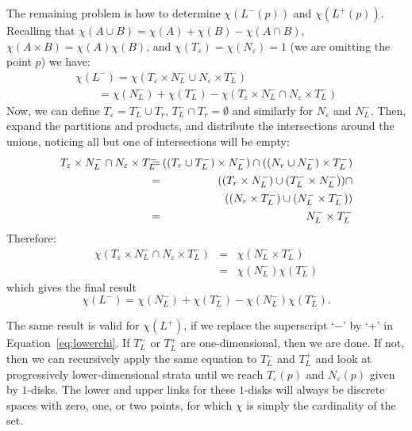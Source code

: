 The remaining problem is how to determine $\chi(L^-(p))$ and
$\chi(L^+(p))$. 
Recalling that $\chi(A \cup B) = \chi(A) + \chi(B) - \chi(A \cap B)$,
$\chi(A\times B)=\chi(A)\chi(B)$, and $\chi(T_\varepsilon)=\chi(N_\varepsilon)=1$ (we are omitting 
the point $p$) we have:
\begin{equation}
\begin{array}{l}
\chi(L^-) = \chi(T_\varepsilon \times N_L^- \cup N_\varepsilon \times T_L^-) \\
    \qquad  = \chi(N_L^-) + \chi(T_L^-) - \chi(T_\varepsilon \times N_L^- \cap N_\varepsilon \times T_L^-)
\end{array}
\end{equation}
Now, we can define $T_\varepsilon = T_L^- \cup T_r,\, T_L^- \cap T_r =
\emptyset$ and similarly for $N_\varepsilon$ and $N_L^-$.  Then,
expand the partitions and products, and distribute the intersections
around the unions, noticing all but one of intersections will be
empty:
\begin{eqnarray*}
T_\varepsilon \times N_L^- \cap N_\varepsilon \times T_L^- \hspace{-8.0px} &=& \hspace{-8.0px} ((T_r \cup T_L^-) \times N_L^-) \cap ((N_r \cup N_L^-) \times T_L^-) \\
\hspace{-8.0px} &=& \hspace{-8.0px} ((T_r \times N_L^-) \cup (T_L^- \times N_L^-)) \cap \\
\hspace{-8.0px} && \hspace{-8.0px}((N_r \times T_L^-) \cup (N_L^- \times T_L^-)) \\
\hspace{-8.0px} &=& \hspace{-8.0px}N_L^- \times T_L^-
\end{eqnarray*}
Therefore:
\begin{eqnarray*}
\chi(T_\varepsilon \times N_L^- \cap N_\varepsilon \times T_L^-) &=& \chi(N_L^- \times T_L^-) \\
&=& \chi(N_L^-)\chi(T_L^-)
\end{eqnarray*}
which gives the final result
\begin{equation}
\chi(L^-) = \chi(N_L^-)+\chi(T_L^-)-\chi(N_L^-)\chi(T_L^-) \label{eq:lowerchi}.
\end{equation}

The same result is valid for $\chi(L^+)$, if we replace the 
superscript `$-$' by `$+$' in Equation~\ref{eq:lowerchi}. If $T_L^-$ or
$T_L^+$ are one-dimensional, then we are done. If not, then we can
recursively apply the same equation to $T_L^-$ and $T_L^+$ and look at
progressively lower-dimensional strata until we reach
$T_\varepsilon(p)$ and $N_\varepsilon(p)$ given by $1$-disks. The
lower and upper links for these \mbox{$1$-disks} will always be
discrete spaces with zero, one, or two points, for which $\chi$ is
simply the cardinality of the set.

